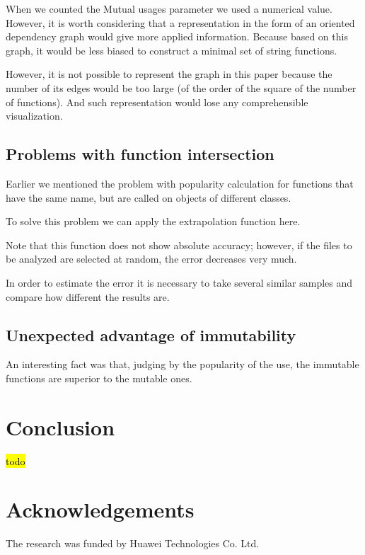 \documentclass[anonymous,sigplan,review,11pt,nonacm,natbib=false]{acmart}
\begin{document}
    When we counted the Mutual usages parameter we used a numerical value. However, it is worth considering that a representation in the form of an oriented dependency graph would give more applied information. Because based on this graph, it would be less biased to construct a minimal set of string functions.

    However, it is not possible to represent the graph in this paper because the number of its edges would be too large (of the order of the square of the number of functions). And such representation would lose any comprehensible visualization.

    \subsection{Problems with function intersection}

    Earlier we mentioned the problem with popularity calculation for functions that have the same name, but are called on objects of different classes.

    To solve this problem we can apply the extrapolation function here.

    Note that this function does not show absolute accuracy; however, if the files to be analyzed are selected at random, the error decreases very much.

    In order to estimate the error it is necessary to take several similar samples and compare how different the results are.

    \subsection{Unexpected advantage of immutability}

    An interesting fact was that, judging by the popularity of the use, the immutable functions are superior to the mutable ones.

    \section{Conclusion}\label{sec:conclusion}

    \hl{todo}

    \section{Acknowledgements}

    The research was funded by Huawei Technologies Co. Ltd.
\end{document}
